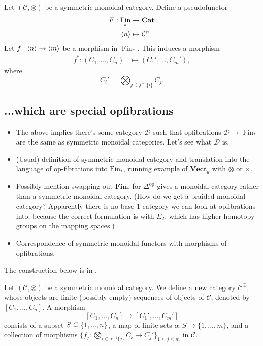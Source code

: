 \documentclass{MetricNotes2023}
\def\subq{\ensuremath\subseteq}
\DeclareMathOperator{\Fin}{Fin}
\begin{document}
Let \((\mathcal{C}, \otimes)\) be a symmetric monoidal category. Define a pseudofunctor 
\begin{align*}
F : \Fin_* &\to \textbf{Cat}\\
\ang{n}&\mapsto \mathcal{C}^n
\end{align*}
Let \(f : \langle n\rangle\to \langle m\rangle\) be a morphism in \(\Fin_*\). This induces a morphism 
\begin{align*}
f^* : (C_1, ...,C_n) &\mapsto (C_1', ..., C_m'),	
\end{align*}
where
\[C_i' = \bigotimes_{j \in f^{-1}\{i\}}C_j.\]
\subsection{...which are special opfibrations}

\begin{itemize}
\item The above implies there's some category \(\mathcal{D}\) such that opfibrations \(\mathcal{D}\to \Fin_*\) are the same as symmetric monoidal categories. Let's see what \(\mathcal{D}\) is.
\item (Usual) definition of symmetric monoidal category and translation into the language of op-fibrations into \(\text{Fin}_*\), running example of \(\textbf{Vect}_k\) with \(\otimes\) or \(\times\). 
\item Possibly mention swapping out \(\textbf{Fin}_*\) for \(\Delta^{\text{op}}\) gives a monoidal category rather than a symmetric monoidal category. (How do we get a braided monoidal category? Apparently there is no base 1-category we can look at opfibrations into, because the correct formulation is with \(E_2\), which has higher homotopy groups on the mapping spaces.)
\item Correspondence of symmetric monoidal functors with morphisms of opfibrations.
\end{itemize}

The construction below is in \autocite{higheralgebra}. 

Let \((\mathcal{C}, \otimes)\) be a symmetric monoidal category. We define a new category \(\mathcal{C}^\otimes\), whose objects are finite (possibly empty) sequences of objects of \(\mathcal{C}\), denoted by \([C_1, ..., C_n]\). A morphism 
\[[C_1, ..., C_n]\to [C_1', ..., C_m']\]
consists of a subset \(S \subq \{1, ..., n\}\), a map of finite sets \(\alpha : S \to \{1, ..., m\}\), and a collection of morphisms \(\{f_j : \bigotimes_{i \in \alpha^{-1}\{j\}} C_i \to C_j'\}_{1 \leq j \leq m}\) in \(\mathcal{C}\). 
\end{document}

